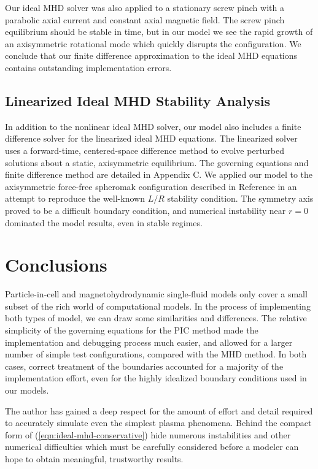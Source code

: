\documentclass[%
 reprint,
 amsmath,amssymb,
 aps,
]{revtex4-2}
\begin{document}
Our ideal MHD solver was also applied to a stationary screw pinch with a parabolic axial current and constant axial magnetic field. The screw pinch equilibrium should be stable in time, but in our model we see the rapid growth of an axisymmetric rotational mode which quickly disrupts the configuration. We conclude that our finite difference approximation to the ideal MHD equations contains outstanding implementation errors.

\subsection{Linearized Ideal MHD Stability Analysis}

In addition to the nonlinear ideal MHD solver, our model also includes a finite difference solver for the linearized ideal MHD equations. The linearized solver uses a forward-time, centered-space difference method to evolve perturbed solutions about a static, axisymmetric equilibrium. The governing equations and finite difference method are detailed in Appendix C. We applied our model to the  axisymmetric force-free spheromak configuration described in Reference \cite{BondesonA1981Tioa} in an attempt to reproduce the well-known $L/R$ stability condition. The symmetry axis proved to be a difficult boundary condition, and numerical instability near $r=0$ dominated the model results, even in stable regimes.

\section{Conclusions}

Particle-in-cell and magnetohydrodynamic single-fluid models only cover a small subset of the rich world of computational models. In the process of implementing both types of model, we can draw some similarities and differences. The relative simplicity of the governing equations for the PIC method made the implementation and debugging process much easier, and allowed for a larger number of simple test configurations, compared with the MHD method. In both cases, correct treatment of the boundaries accounted for a majority of the implementation effort, even for the highly idealized boundary conditions used in our models.

The author has gained a deep respect for the amount of effort and detail required to accurately simulate even the simplest plasma phenomena. Behind the compact form of (\ref{eqn:ideal-mhd-conservative}) hide numerous instabilities and other numerical difficulties which must be carefully considered before a modeler can hope to obtain meaningful, trustworthy results.
\end{document}
